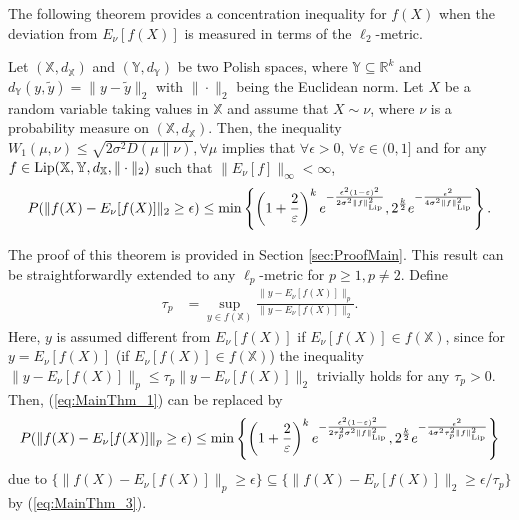 \documentclass[twoside,11pt]{article}
\begin{document}
The following theorem provides a concentration inequality for $f(X)$ when the deviation from $E_{\nu}[f(X)]$ is measured in terms of the $\ell_2$-metric.

\begin{theorem}\label{thm:MainThm}
Let $(\mathbb{X},d_{\mathbb{X}})$ and $(\mathbb{Y},d_{\mathbb{Y}})$ be two  Polish spaces, where $\mathbb{Y}\subseteq \mathbb{R}^k$ and $d_{\mathbb{Y}}(y,\tilde{y})=\|y-\tilde{y}\|_2$ with $\|\cdot\|_2$ being the Euclidean norm.  Let $X$ be a random variable taking values in $\mathbb{X}$ and assume that $X\sim \nu$, where $\nu$ is a probability measure on $(\mathbb{X},d_{\mathbb{X}})$. Then, the inequality $W_{1}(\mu,\nu)\leq \sqrt{2\sigma^2 D(\mu\|\nu)}, \forall \mu$ implies that $\forall \epsilon>0$, $\forall \varepsilon\in (0,1]$ and for any $f\in {\rm Lip}(\mathbb{X},\mathbb{Y},d_{\mathbb{X}},\|\cdot\|_2)$ such that $\|E_{\nu}[f]\|_\infty<\infty$,
\begin{align}\label{eq:MainThm_1}
P(\|f(X)-E_{\nu}[f(X)]\|_2\geq \epsilon)\leq \min\left\{\left(1+\frac{2}{\varepsilon}\right)^k e^{-\frac{\epsilon^2 (1-\varepsilon)^2}{2 \sigma^2\|f\|_{\rm Lip}^2}}, 2^{\frac{k}{2}}e^{-\frac{\epsilon^2}{4\sigma^2 \|f\|_{\rm Lip}^2}}\right\}.
\end{align}
\end{theorem}  

The proof of this theorem is provided in Section \ref{sec:ProofMain}.  This result can be straightforwardly extended to  any $\ell_p$-metric for $p\geq 1, p\neq 2$. Define 
\begin{align}\label{eq:MainThm_3}
\tau_p&=\sup_{y\in f(\mathbb{X})}\frac{\|y-E_{\nu}[f(X)]\|_p}{\|y-E_{\nu}[f(X)]\|_2}.
\end{align}
Here, $y$ is assumed different from $E_{\nu}[f(X)]$ if $E_{\nu}[f(X)]\in f(\mathbb{X})$, since for $y=E_{\nu}[f(X)]$ (if $E_{\nu}[f(X)]\in f(\mathbb{X})$) the inequality $\|y-E_{\nu}[f(X)]\|_p\leq \tau_p \|y-E_{\nu}[f(X)]\|_2$ trivially holds  for any $\tau_p>0$. Then, (\ref{eq:MainThm_1}) can be replaced by 
\begin{align}\label{eq:MainThm_4}
P(\|f(X)-E_{\nu}[f(X)]\|_p\geq \epsilon)\leq \min\left\{\left(1+\frac{2}{\varepsilon}\right)^k e^{-\frac{\epsilon^2 (1-\varepsilon)^2}{2\tau_p^2 \sigma^2\|f\|_{\rm Lip}^2}}, 2^{\frac{k}{2}}e^{-\frac{\epsilon^2}{4\sigma^2\tau_p^2 \|f\|_{\rm Lip}^2}}\right\}
\end{align}
due to $\{\|f(X)-E_{\nu}[f(X)]\|_p\geq \epsilon\}\subseteq \{\|f(X)-E_{\nu}[f(X)]\|_2\geq \epsilon/\tau_p\}$ by (\ref{eq:MainThm_3}).
\end{document}
